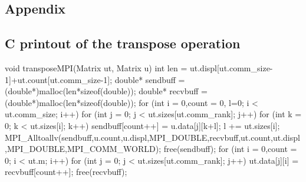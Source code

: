 \documentclass[11pt,a4paper,english]{article}
\numberwithin{figure}{subsection}
\numberwithin{table}{subsection}
\begin{document}
\begin{appendix}
\section{Appendix}
\subsection{C printout of the transpose operation}
\begin{ccode}
void transposeMPI(Matrix ut, Matrix u){
	int len = ut.displ[ut.comm_size-1]+ut.count[ut.comm_size-1];
	double* sendbuff = (double*)malloc(len*sizeof(double));
	double* recvbuff = (double*)malloc(len*sizeof(double));
	for (int i = 0,count = 0, l=0; i < ut.comm_size; i++){
		for (int j = 0; j < ut.sizes[ut.comm_rank]; j++){
			for (int k = 0; k < ut.sizes[i]; k++){
				sendbuff[count++] = u.data[j][k+l];
			}
		}
		l += ut.sizes[i];
	}
	MPI_Alltoallv(sendbuff,u.count,u.displ,MPI_DOUBLE,recvbuff,ut.count,ut.displ,MPI_DOUBLE,MPI_COMM_WORLD);
	free(sendbuff);
	for (int i = 0,count = 0; i < ut.m; i++){
		for (int j = 0; j < ut.sizes[ut.comm_rank]; j++){
			ut.data[j][i] = recvbuff[count++];
		}
	}
	free(recvbuff);
}
\end{ccode}

\end{appendix}
\end{document}
